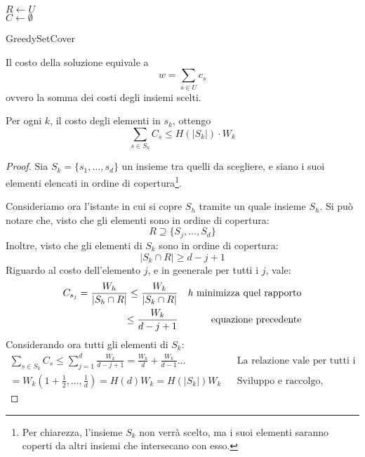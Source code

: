 \begin{algorithm}[H]
    \SetAlgoLined
     $R \gets U$\\
     $C \gets \emptyset$\\
     \caption{GreedySetCover}
\end{algorithm}

\begin{remark}
    \label{oss1set}
    Il costo della soluzione equivale a $$w = \sum_{s\in U}c_s$$ ovvero la somma dei costi 
    degli insiemi scelti.
\end{remark}
\begin{remark}
    \label{oss2set}
    Per ogni $k$, il costo degli elementi in $s_k$, ottengo 
    $$\sum_{s \in S_k}C_s \leq H(|S_k|) \cdot  W_k$$
\end{remark}
\begin{proof}
    Sia $S_k = \{s_1, \dots, s_d\}$ un insieme tra quelli da scegliere, e siano 
    i suoi elementi elencati in ordine di copertura\footnote{Per chiarezza, l'insieme $S_k$ non verrà scelto, 
    ma i suoi elementi saranno coperti da altri insiemi che intersecano con esso.}.

    Consideriamo ora l'istante in cui si copre $S_h$ tramite un quale insieme $S_h$.
    Si può notare che, visto che gli elementi sono in ordine di copertura: 
    $$R \supseteq \{S_j, \dots, S_d \}$$
    Inoltre, visto che gli elementi di $S_k$ sono in ordine di copertura: 
    $$|S_k \cap R| \geq d-j+1$$
    Riguardo al costo dell'elemento $j$, e in geenerale per tutti i $j$, vale:
    \begin{equation}
        \begin{aligned}
            C_{s_j} = \frac{W_h}{|S_h \cap R|} \leq \frac{W_k}{|S_k \cap R|} && \text{\emph{h} minimizza quel rapporto}\\
            \leq \frac{W_k}{d-j+1} && \text{equazione precedente}\\
        \end{aligned}
    \end{equation}
    Considerando ora tutti gli elementi di $S_k$: 
    \begin{equation}
        \begin{aligned}
            \sum_{s\in S_k} C_s \leq \sum_{j=1}^{d}\frac{W_k}{d-j+1} = \frac{W_k}{d} + \frac{W_k}{d-1} \dots && \text{La relazione vale per tutti i j}\\
            = W_k(1 + \frac{1}{2}, \dots, \frac{1}{d}) = H(d)W_k = H(|S_k|)W_k && \text{Sviluppo e raccolgo, ottengo l'oss.}
        \end{aligned}
    \end{equation}
\end{proof}
